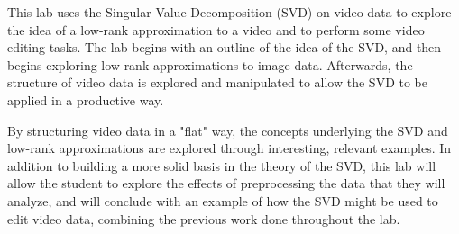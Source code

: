 This lab uses the Singular Value Decomposition (SVD) on video data to explore the idea of a low-rank approximation to a video and to perform some video editing tasks. The lab begins with an outline of the idea of the SVD, and then begins exploring low-rank approximations to image data. Afterwards, the structure of video data is explored and manipulated to allow the SVD to be applied in a productive way.

By structuring video data in a "flat" way, the concepts underlying the SVD and low-rank approximations are explored through interesting, relevant examples. In addition to building a more solid basis in the theory of the SVD, this lab will allow the student to explore the effects of preprocessing the data that they will analyze, and will conclude with an example of how the SVD might be used to edit video data, combining the previous work done throughout the lab.